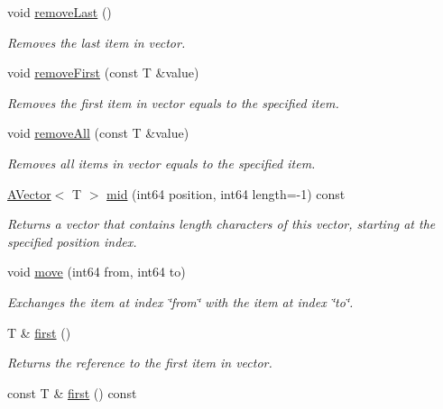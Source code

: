 \begin{DoxyCompactItemize}
\mbox{\label{class_a_vector_ad34deeefc2360e10c682d6b11831233a}} 
void \mbox{\hyperlink{class_a_vector_ad34deeefc2360e10c682d6b11831233a}{remove\+Last}} ()
\begin{DoxyCompactList}\small\item\em Removes the last item in vector. \end{DoxyCompactList}\item 
void \mbox{\hyperlink{class_a_vector_a33f1e98af680a5c9e430dc11beeb4dd8}{remove\+First}} (const T \&value)
\begin{DoxyCompactList}\small\item\em Removes the first item in vector equals to the specified item. \end{DoxyCompactList}\item 
void \mbox{\hyperlink{class_a_vector_a521f435b2b3c74c92d6cbe94bc3faddd}{remove\+All}} (const T \&value)
\begin{DoxyCompactList}\small\item\em Removes all items in vector equals to the specified item. \end{DoxyCompactList}\item 
\mbox{\hyperlink{class_a_vector}{A\+Vector}}$<$ T $>$ \mbox{\hyperlink{class_a_vector_a6edc7065ff507e44537fd6e9053f98bf}{mid}} (int64 position, int64 length=-\/1) const
\begin{DoxyCompactList}\small\item\em Returns a vector that contains length characters of this vector, starting at the specified position index. \end{DoxyCompactList}\item 
void \mbox{\hyperlink{class_a_vector_a4a3c6ccac7533cee9e2e2a0fddde0d77}{move}} (int64 from, int64 to)
\begin{DoxyCompactList}\small\item\em Exchanges the item at index \char`\"{}from\char`\"{} with the item at index \char`\"{}to\char`\"{}. \end{DoxyCompactList}\item 
T \& \mbox{\hyperlink{class_a_vector_a9ad79c8f2af06e68a9eb022cae0bb966}{first}} ()
\begin{DoxyCompactList}\small\item\em Returns the reference to the first item in vector. \end{DoxyCompactList}\item 
const T \& \mbox{\hyperlink{class_a_vector_a960abfbaf4b7b395286c82d79571147a}{first}} () const

\end{DoxyCompactItemize}
